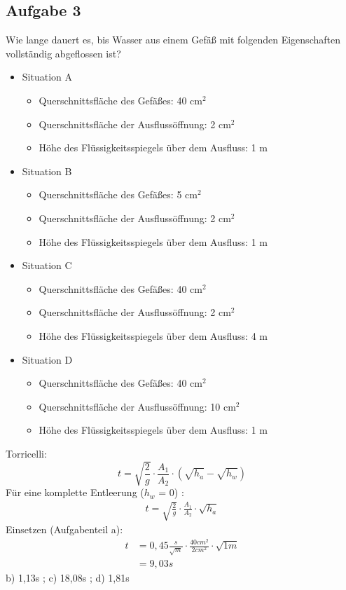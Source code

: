 \documentclass[a4paper,11pt]{article}
\begin{document}
\pagebreak
\subsection*{Aufgabe 3}
Wie lange dauert es, bis Wasser aus einem Gefäß mit folgenden Eigenschaften vollständig abgeflossen ist?

\begin{itemize}
\item Situation A
\begin{itemize}
    \item  Querschnittsfläche des Gefäßes: 40 cm$^2$
    \item  Querschnittsfläche der Ausflussöffnung: 2 cm$^2$
    \item  Höhe des Flüssigkeitsspiegels über dem Ausfluss: 1 m
\end{itemize}
\item Situation B
\begin{itemize}
    \item  Querschnittsfläche des Gefäßes: 5 cm$^2$
    \item  Querschnittsfläche der Ausflussöffnung: 2 cm$^2$
    \item  Höhe des Flüssigkeitsspiegels über dem Ausfluss: 1 m
\end{itemize}
\item Situation C
\begin{itemize}
    \item  Querschnittsfläche des Gefäßes: 40 cm$^2$
    \item  Querschnittsfläche der Ausflussöffnung: 2 cm$^2$
    \item  Höhe des Flüssigkeitsspiegels über dem Ausfluss: 4 m
\end{itemize}
\item Situation D
\begin{itemize}
    \item  Querschnittsfläche des Gefäßes: 40 cm$^2$
    \item  Querschnittsfläche der Ausflussöffnung: 10 cm$^2$
    \item  Höhe des Flüssigkeitsspiegels über dem Ausfluss: 1 m
\end{itemize}
\end{itemize}

\ppbig
 

Torricelli:
\begin{equation}
t = \sqrt{\frac{2}{g}} \cdot \frac{A_1}{A_2} \cdot (\sqrt{h_a} - \sqrt{h_w})
\end{equation}
Für eine komplette Entleerung ($h_w$ = 0) :
\begin{align*}
t = \sqrt{\frac{2}{g}} \cdot \frac{A_1}{A_2} \cdot \sqrt{h_a}
\end{align*}
Einsetzen (Aufgabenteil a):
\begin{align*}
t &= 0,45 \frac{s}{\sqrt{m}}\cdot \frac{40cm^2}{2cm^2} \cdot \sqrt{1m} \\
 &= 9,03s 
\end{align*}
b) 1,13s ; c) 18,08s ; d) 1,81s \par 
\end{document}
